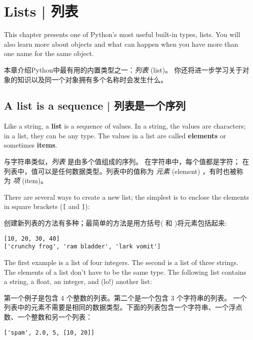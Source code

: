 

\chapter{Lists  |  列表}

This chapter presents one of Python's most useful built-in types, lists.
You will also learn more about objects and what can happen when you have
more than one name for the same object.

本章介绍Python中最有用的内置类型之一：{\em 列表} (list)。 你还将进一步学习关于对象的知识以及同一个对象拥有多个名称时会发生什么。

\section{A list is a sequence  |  列表是一个序列}
\label{sequence}

Like a string, a {\bf list} is a sequence of values.  In a string, the
values are characters; in a list, they can be any type.  The values in
a list are called {\bf elements} or sometimes {\bf items}.

与字符串类似，{\em 列表} 是由多个值组成的序列。 在字符串中，每个值都是字符；
在列表中，值可以是任何数据类型。列表中的值称为 {\em 元素} (element) ，有时也被称为 {\em 项} (item)。

  
  

There are several ways to create a new list; the simplest is to
enclose the elements in square brackets (\verb"[" and \verb"]"):

创建新列表的方法有多种；最简单的方法是用方括号( \li{[} 和 \li{]} )将元素包括起来:

\begin{lstlisting}
[10, 20, 30, 40]
['crunchy frog', 'ram bladder', 'lark vomit']
\end{lstlisting}

%
The first example is a list of four integers.  The second is a list of
three strings.  The elements of a list don't have to be the same type.
The following list contains a string, a float, an integer, and
(lo!) another list:

第一个例子是包含 4 个整数的列表。第二个是一个包含 3 个字符串的列表。
一个列表中的元素不需要是相同的数据类型。下面的列表包含一个字符串、一个浮点数、一个整数和另一个列表：

\begin{lstlisting}
['spam', 2.0, 5, [10, 20]]
\end{lstlisting}


